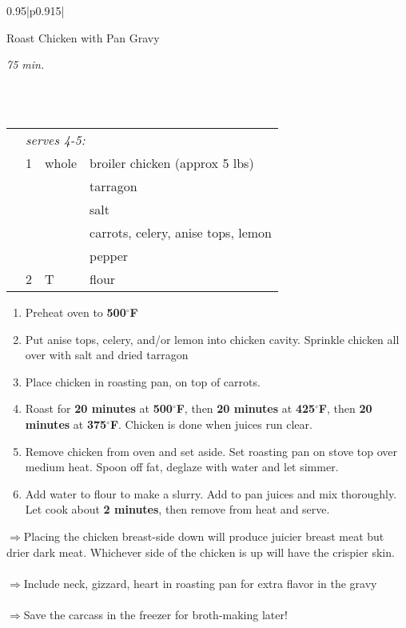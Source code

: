 \documentclass[8pt]{report}
\newcommand{\ingredmargin}{0.25cm}
\newcommand{\F}{$^\circ$F}
\newenvironment{recipe}[3]
  {\bigskip \bigskip 
\begin{tabular*}{0.95\textwidth}{|p{0.915\textwidth}|} \hline \vspace{0.25mm}
\begin{minipage}{0.7\textwidth}	\begin{flushleft} {\Large \textsf{#1}} \end{flushleft} \end{minipage}
\begin{minipage}{0.2\textwidth} \begin{flushright} \emph{#2} \end{flushright} \end{minipage} \\ \\ \hline
\begin{ingreds}{#3} \addcontentsline{toc}{section}{#1} \phantomsection \label{rec:#1}} 
  {\\ \hline \end{tabular*} \noindent}
\newenvironment{ingreds}[1]
  {\begin{tabular}{lrlp{0.6\textwidth}} \hspace{\ingredmargin} & \multicolumn{3}{l}{\it #1:} \\}
  {\end{tabular} \medskip}
\newcommand{\ingredsdone}{\end{ingreds}\begin{enumerate}}
\newcommand{\stepsdone}{\end{enumerate} \medskip}
\newcommand{\ingredient}[3]{\hspace{\ingredmargin} & #1 & #2 & #3 \\}
\newcommand{\tip}{$\Rightarrow$}
\begin{document}
\begin{recipe}{Roast Chicken with Pan Gravy}{75 min.}{serves 4-5}
\index{chicken!roast}
\ingredient{1}{whole}{broiler chicken (approx 5 lbs)}
\ingredient{}{}{tarragon}
\ingredient{}{}{salt}
\ingredient{}{}{carrots, celery, anise tops, lemon}
\ingredient{}{}{pepper}
\ingredient{2}{T}{flour}
\ingredsdone
\item Preheat oven to {\bf 500\F}
\item Put anise tops, celery, and/or lemon into chicken cavity.  Sprinkle chicken all over with salt and dried tarragon
\item Place chicken in roasting pan, on top of carrots.
\item Roast for {\bf 20 minutes} at {\bf 500\F}, then {\bf 20 minutes} at {\bf 425\F}, then {\bf 20 minutes} at {\bf 375\F}.  Chicken is done when juices run clear.
\item Remove chicken from oven and set aside.  Set roasting pan on stove top over medium heat.  Spoon off fat, deglaze with water and let simmer.
\item Add water to flour to make a slurry.  Add to pan juices and mix thoroughly.  Let cook about {\bf 2 minutes}, then remove from heat and serve.
\stepsdone
\noindent \tip Placing the chicken breast-side down will produce juicier breast meat but drier dark meat.  Whichever side of the chicken is up will have the crispier skin.\\
\\
\tip Include neck, gizzard, heart in roasting pan for extra flavor in the gravy\\
\\
\tip Save the carcass in the freezer for broth-making later!
\end{recipe}


\newpage



\centering
\end{document}
